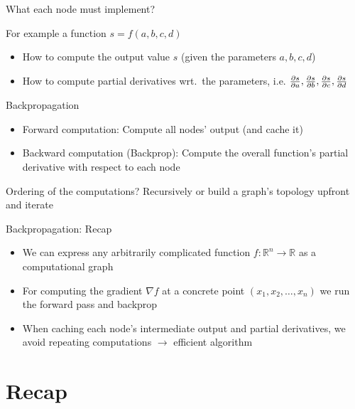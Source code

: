 \documentclass[12pt,aspectratio=169]{beamer}
\begin{document}
\begin{frame}{What each node must implement?}
	
For example a function $s = f(a, b, c, d)$

\begin{itemize}
	\item How to compute the output value $s$ (given the parameters $a, b, c, d$)
	\item How to compute partial derivatives wrt.\ the parameters, i.e. $\pdv{s}{a}, \pdv{s}{b}, \pdv{s}{c}, \pdv{s}{d}$
\end{itemize}
	
\end{frame}

\begin{frame}{Backpropagation}

\begin{itemize}
	\item Forward computation: Compute all nodes' output (and cache it)
	\item Backward computation (Backprop): Compute the overall function's partial derivative with respect to each node
\end{itemize}

\bigskip

Ordering of the computations? Recursively or build a graph's topology upfront and iterate

\end{frame}


\begin{frame}{Backpropagation: Recap}
\begin{itemize}
	\item We can express any arbitrarily complicated function $f: \mathbb{R}^n \to \mathbb{R}$ as a computational graph
	\item For computing the gradient $\nabla f$ at a concrete point $(x_1, x_2, \ldots, x_n)$ we run the forward pass and backprop
	\item When caching each node's intermediate output and partial derivatives, we avoid repeating computations $\to$ efficient algorithm
\end{itemize}
\end{frame}


\section*{Recap}
\end{document}
